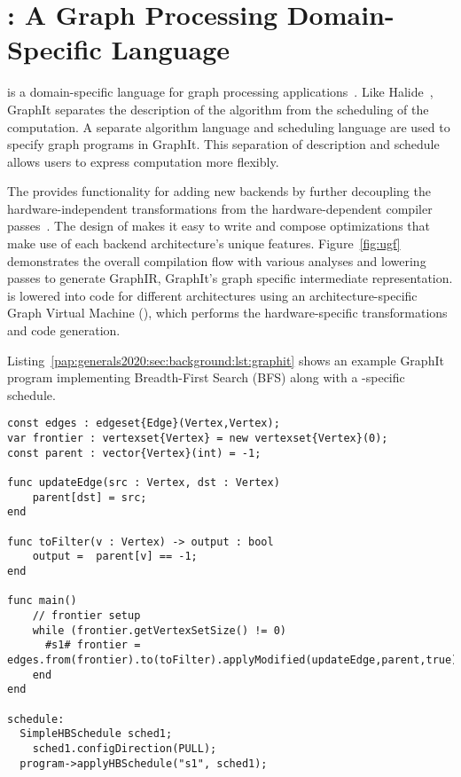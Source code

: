 
\section{\graphit: A Graph Processing Domain-Specific Language}\label{pap:generals2020:sec:graphit}
\ugfoverview
\graphit is a domain-specific language for graph processing applications~\citep{zhang2018graphit}.
Like Halide~\citep{ragan2013halide}, GraphIt separates the description of the algorithm from the scheduling of the computation. 
A separate algorithm language and scheduling language are used to specify graph programs in GraphIt. 
This separation of description and schedule allows users to express computation more flexibly.

The \ugc provides functionality for adding new backends by further decoupling the hardware-independent transformations from the hardware-dependent compiler passes~\cite{brahmakshatriya2021taming}.
The design of \ugc makes it easy to write and compose optimizations that make use of each backend architecture's unique features.
Figure~\ref{fig:ugf} demonstrates the overall compilation flow with various analyses and lowering passes to generate GraphIR, GraphIt's graph specific intermediate representation.
\graphisa is lowered into code for different architectures using an architecture-specific Graph Virtual Machine (\graphvm), which performs the hardware-specific transformations and code generation.

Listing~\ref{pap:generals2020:sec:background:lst:graphit} shows an example GraphIt program implementing Breadth-First Search (BFS) along with a \hb-specific schedule.
\hfill
\break 
\begin{lstlisting}[language=graphit, 
                   caption=GraphIt code for Breadth-First Search (BFS) with a HammerBlade manycore schedule.,
                   label=pap:generals2020:sec:background:lst:graphit]
const edges : edgeset{Edge}(Vertex,Vertex);
var frontier : vertexset{Vertex} = new vertexset{Vertex}(0);
const parent : vector{Vertex}(int) = -1;

func updateEdge(src : Vertex, dst : Vertex)
    parent[dst] = src;
end

func toFilter(v : Vertex) -> output : bool
    output =  parent[v] == -1;
end

func main()
    // frontier setup
    while (frontier.getVertexSetSize() != 0)
      #s1# frontier = edges.from(frontier).to(toFilter).applyModified(updateEdge,parent,true);
    end
end

schedule:
  SimpleHBSchedule sched1;
    sched1.configDirection(PULL);
  program->applyHBSchedule("s1", sched1);
\end{lstlisting}

